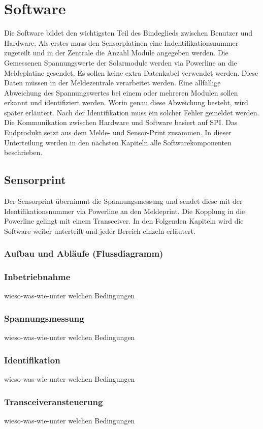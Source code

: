 \section{Software}
Die Software bildet den wichtigsten Teil des Bindeglieds zwischen Benutzer und Hardware. Als erstes muss den Sensorplatinen eine Indentifikationsnummer zugeteilt und in der Zentrale die Anzahl Module angegeben werden. Die Gemessenen Spannungswerte der Solarmodule werden via Powerline an die Meldeplatine gesendet. Es sollen keine extra Datenkabel verwendet werden. Diese Daten müssen in der Meldezentrale verarbeitet werden. Eine allfällige Abweichung des Spannungswertes bei einem oder mehreren Modulen sollen erkannt und identifiziert werden. Worin genau diese Abweichung besteht, wird später erläutert. Nach der Identifikation muss ein solcher Fehler gemeldet werden. Die Kommunikation zwischen Hardware und Software basiert auf SPI. Das Endprodukt setzt aus dem Melde- und Sensor-Print zusammen. In dieser Unterteilung werden in den nächsten Kapiteln alle Softwarekomponenten beschrieben.
\subsection{Sensorprint}
Der Sensorprint übernimmt die Spannungsmessung und sendet diese mit der Identifikationsnummer via Powerline an den Meldeprint. Die Kopplung in die Powerline gelingt mit einem Transceiver. In den Folgenden Kapiteln wird die Software weiter unterteilt und jeder Bereich einzeln erläutert.
\subsubsection{Aufbau und Abläufe (Flussdiagramm)}
\subsubsection{Inbetriebnahme}
wieso-was-wie-unter welchen Bedingungen
\subsubsection{Spannungsmessung}
wieso-was-wie-unter welchen Bedingungen
\subsubsection{Identifikation}
wieso-was-wie-unter welchen Bedingungen
\subsubsection{Transceiveransteuerung}
wieso-was-wie-unter welchen Bedingungen

